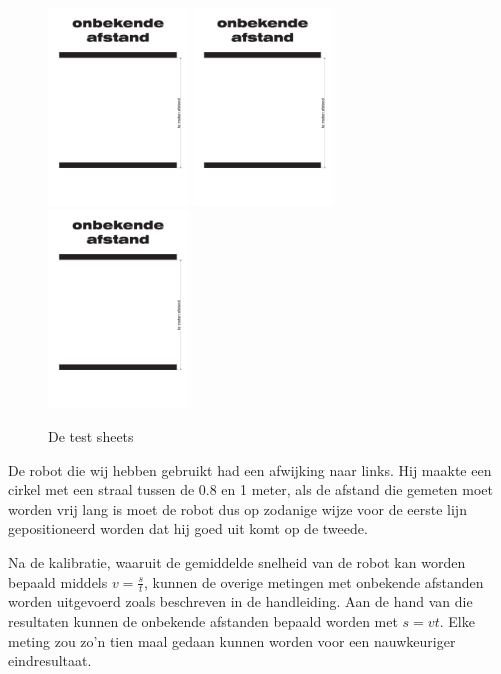 \documentclass{report}
\begin{document}
\begin{figure}[H]
\includegraphics[width=0.33\textwidth,page=2]{test_sheets_A3-rc.pdf}
\includegraphics[width=0.33\textwidth,page=1]{test_sheets_A3-rc.pdf}
\includegraphics[width=0.33\textwidth,page=3]{test_sheets_A3-rc.pdf}
\caption{De test sheets}
\label{fig:testSheets}
\end{figure}
De robot die wij hebben gebruikt had een afwijking naar links. Hij maakte een cirkel met een straal tussen de 0.8 en 1 meter, als de afstand die gemeten moet worden vrij lang is moet de robot dus op zodanige wijze voor de eerste lijn gepositioneerd worden dat hij goed uit komt op de tweede.

Na de kalibratie, waaruit de gemiddelde snelheid van de robot kan worden bepaald middels $v=\frac{s}{t}$, kunnen de overige metingen met onbekende afstanden worden uitgevoerd zoals beschreven in de handleiding. Aan de hand van die resultaten kunnen de onbekende afstanden bepaald worden met $s=vt$. Elke meting zou zo'n tien maal gedaan kunnen worden voor een nauwkeuriger eindresultaat.
\end{document}
